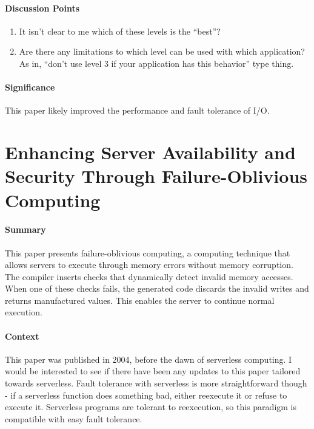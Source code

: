 \paragraph{\textbf{Discussion Points}}
\begin{enumerate}
    \item It isn't clear to me which of these levels is the ``best''?
    \item Are there any limitations to which level can be used with which
    application? As in, ``don't use level 3 if your application has this
    behavior'' type thing.
\end{enumerate}

\paragraph{\textbf{Significance}}
This paper likely improved the performance and fault tolerance of I/O.

\section {Enhancing Server Availability and Security Through Failure-Oblivious Computing \cite{rinard2004enhancing}}

\paragraph{\textbf{Summary}}
This paper presents failure-oblivious computing, a computing technique that
allows servers to execute through memory errors without memory corruption. The
compiler inserts checks that dynamically detect invalid memory accesses. When
one of these checks fails, the generated code discards the invalid writes and
returns manufactured values. This enables the server to continue normal
execution.

\paragraph{\textbf{Context}}
This paper was published in 2004, before the dawn of serverless computing. I
would be interested to see if there have been any updates to this paper tailored
towards serverless. Fault tolerance with serverless is more straightforward
though - if a serverless function does something bad, either reexecute it or
refuse to execute it. Serverless programs are tolerant to reexecution, so this
paradigm is compatible with easy fault tolerance.

